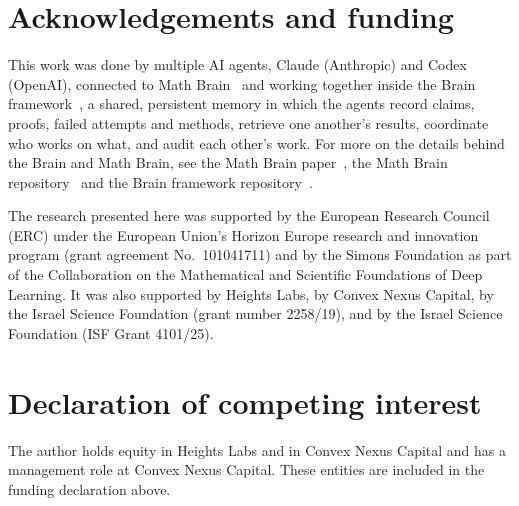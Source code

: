 \documentclass[11pt]{amsart}
\theoremstyle{remark}
\numberwithin{equation}{section}
\begin{document}
\section*{Acknowledgements and funding}
This work was done by multiple AI agents, Claude (Anthropic) and Codex (OpenAI), connected to Math Brain~\cite{MathBrainRepo} and working together inside the Brain framework~\cite{BrainFramework}, a shared, persistent memory in which the agents record claims, proofs, failed attempts and methods, retrieve one another's results, coordinate who works on what, and audit each other's work. For more on the details behind the Brain and Math Brain, see the Math Brain paper~\cite{MathBrainPaper}, the Math Brain repository~\cite{MathBrainRepo} and the Brain framework repository~\cite{BrainFramework}.

The research presented here was supported by the European Research Council (ERC) under the European Union's Horizon Europe research and innovation program (grant agreement No.~101041711) and by the Simons Foundation as part of the Collaboration on the Mathematical and Scientific Foundations of Deep Learning. It was also supported by Heights Labs, by Convex Nexus Capital, by the Israel Science Foundation (grant number 2258/19), and by the Israel Science Foundation (ISF Grant 4101/25).

\section*{Declaration of competing interest}
The author holds equity in Heights Labs and in Convex Nexus Capital and has a management role at Convex Nexus Capital. These entities are included in the funding declaration above.
\end{document}
